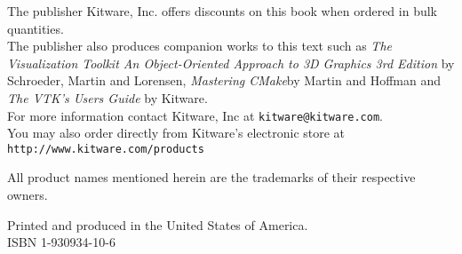 \begin{minipage}[t][3cm][b]{\textwidth}
\begin{center}
The publisher Kitware, Inc. offers discounts on this book when ordered in bulk quantities.\\
The publisher also produces companion works to this text such as \emph{The Visualization Toolkit An Object-Oriented Approach to 3D Graphics 3rd Edition} by Schroeder, Martin and Lorensen, \emph{Mastering CMake}by Martin and Hoffman and \emph{The VTK's Users Guide} by Kitware.\\
For more information contact Kitware, Inc at \texttt{kitware@kitware.com}.\\
You may also order directly from Kitware's electronic store at \texttt{http://www.kitware.com/products}\\
\end{center}
\end{minipage}


\begin{minipage}[t][3cm][b]{\textwidth}
\begin{center}
All product names mentioned herein are the trademarks of their respective owners.
\end{center}
\end{minipage}


\begin{minipage}[t][3cm][b]{\textwidth}
\begin{center}
Printed and produced in the United States of America.\\
ISBN 1-930934-10-6
\end{center}
\end{minipage}


\newpage

